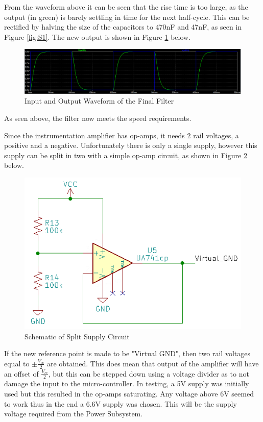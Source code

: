 \documentclass[class=report,11pt,crop=false]{standalone}
\begin{document}
	From the waveform above it can be seen that the rise time is too large, as the output (in green) is barely settling in time for the next half-cycle. This can be rectified by halving the size of the capacitors to 470nF and 47nF, as seen in Figure \ref{fig:S1}. The new output is shown in Figure \ref{fig:S4} below.
	
	\begin{figure}[h!]
		\centering
		\includegraphics[width=0.9\linewidth]{Figures/Filter Waveform2.png}
		\caption{Input and Output Waveform of the Final Filter}
		\label{fig:S4}
	\end{figure}
	As seen above, the filter now meets the speed requirements.
	
	Since the instrumentation amplifier has op-amps, it needs 2 rail voltages, a positive and a negative. Unfortunately there is only a single supply, however this supply can be split in two with a simple op-amp circuit, as shown in Figure \ref{fig:S5} below.
	\begin{figure}[h!]
		\centering
		\includegraphics[width=0.6\linewidth]{Figures/Split Supply.png}
		\caption{Schematic of Split Supply Circuit}
		\label{fig:S5}
	\end{figure}
	
	If the new reference point is made to be "Virtual GND", then two rail voltages equal to $\pm \frac{V_{cc}}{2}$ are obtained. This does mean that output of the amplifier will have an offset of $\frac{V_{cc}}{2}$, but this can be stepped down using a voltage divider as to not damage the input to the micro-controller. In testing, a 5V supply was initially used but this resulted in the op-amps saturating. Any voltage above 6V seemed to work thus in the end a 6.6V supply was chosen. This will be the supply voltage required from the Power Subsystem.
	
\end{document}
